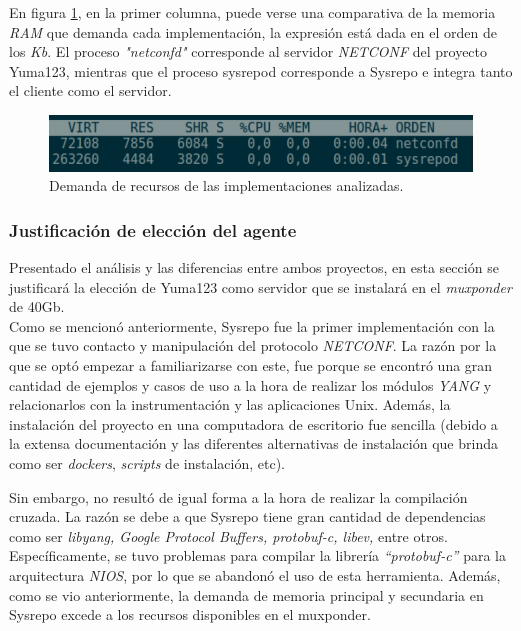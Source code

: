 \begin{itemize}
	En figura \ref{fig:consumoagentes}, en la primer columna, puede verse una comparativa de la memoria \textit{RAM} que demanda cada implementación, la expresión está dada en el orden de los \textit{Kb}. El proceso \textit{"netconfd"} corresponde al servidor \textit{NETCONF} del proyecto Yuma123, mientras que el proceso sysrepod corresponde a Sysrepo e integra tanto el cliente como el servidor.


	\begin{figure}[H]
		\centering
		\includegraphics[scale=0.9]{Figures/consumoagentes.pdf}
		\caption{Demanda de recursos de las implementaciones analizadas.}
		\label{fig:consumoagentes}
	  \end{figure}
	\end{itemize}


	\subsubsection{Justificación de elección del agente}

	Presentado el análisis y las diferencias entre ambos proyectos, en esta sección se justificará la elección de Yuma123 como servidor que se instalará en el \textit{muxponder} de 40Gb.
	\\
	
	Como se mencionó anteriormente, Sysrepo fue la primer implementación con la que se tuvo contacto y manipulación del protocolo \textit{NETCONF}. La razón por la que se optó empezar a familiarizarse con este, fue porque se encontró una gran cantidad de ejemplos y casos de uso a la hora de realizar los módulos \textit{YANG} y relacionarlos con la instrumentación y las aplicaciones Unix. Además, la instalación del proyecto en una computadora de escritorio fue sencilla (debido a la extensa documentación y las diferentes alternativas de instalación que brinda como ser \textit{dockers}, \textit{scripts} de instalación, etc).

	Sin embargo, no resultó de igual forma a la hora de realizar la compilación cruzada. La razón se debe a que Sysrepo tiene gran cantidad de dependencias como ser \textit{libyang, Google Protocol Buffers, protobuf-c, libev,} entre otros. Específicamente, se tuvo problemas para compilar la librería \textit{“protobuf-c”} para la arquitectura \textit{NIOS}, por lo que se abandonó el uso de esta herramienta. Además, como se vio anteriormente, la demanda de memoria principal y secundaria en Sysrepo excede a los recursos disponibles en el muxponder.
	\\

